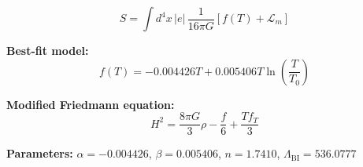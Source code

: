 
\begin{equation}
  S = \int d^4x \, |e| \, \frac{1}{16\pi G} \left[ f(T) + \mathcal{L}_m \right]
\end{equation}

\textbf{Best-fit model:}
\begin{equation}
  f(T) = -0.004426 T + 0.005406 T \ln\!\left(\frac{T}{T_0}\right)
\end{equation}

\textbf{Modified Friedmann equation:}
\begin{equation}
  H^2 = \frac{8\pi G}{3} \rho - \frac{f}{6} + \frac{T f_T}{3}
\end{equation}

\textbf{Parameters:}
$\alpha = -0.004426$, \quad
$\beta = 0.005406$, \quad
$n = 1.7410$, \quad
$\Lambda_{\text{BI}} = 536.0777$